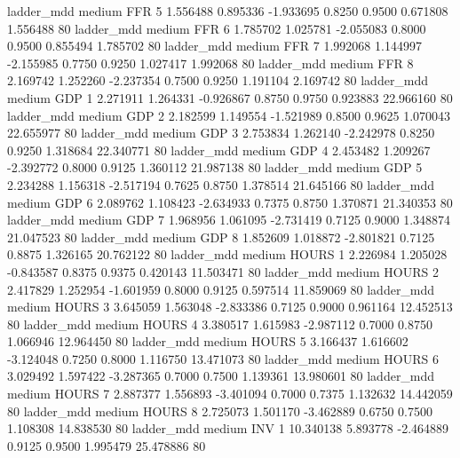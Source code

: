             ladder_mdd     medium      FFR                 5  1.556488 0.895336 -1.933695 0.8250 0.9500  0.671808    1.556488 80
            ladder_mdd     medium      FFR                 6  1.785702 1.025781 -2.055083 0.8000 0.9500  0.855494    1.785702 80
            ladder_mdd     medium      FFR                 7  1.992068 1.144997 -2.155985 0.7750 0.9250  1.027417    1.992068 80
            ladder_mdd     medium      FFR                 8  2.169742 1.252260 -2.237354 0.7500 0.9250  1.191104    2.169742 80
            ladder_mdd     medium      GDP                 1  2.271911 1.264331 -0.926867 0.8750 0.9750  0.923883   22.966160 80
            ladder_mdd     medium      GDP                 2  2.182599 1.149554 -1.521989 0.8500 0.9625  1.070043   22.655977 80
            ladder_mdd     medium      GDP                 3  2.753834 1.262140 -2.242978 0.8250 0.9250  1.318684   22.340771 80
            ladder_mdd     medium      GDP                 4  2.453482 1.209267 -2.392772 0.8000 0.9125  1.360112   21.987138 80
            ladder_mdd     medium      GDP                 5  2.234288 1.156318 -2.517194 0.7625 0.8750  1.378514   21.645166 80
            ladder_mdd     medium      GDP                 6  2.089762 1.108423 -2.634933 0.7375 0.8750  1.370871   21.340353 80
            ladder_mdd     medium      GDP                 7  1.968956 1.061095 -2.731419 0.7125 0.9000  1.348874   21.047523 80
            ladder_mdd     medium      GDP                 8  1.852609 1.018872 -2.801821 0.7125 0.8875  1.326165   20.762122 80
            ladder_mdd     medium    HOURS                 1  2.226984 1.205028 -0.843587 0.8375 0.9375  0.420143   11.503471 80
            ladder_mdd     medium    HOURS                 2  2.417829 1.252954 -1.601959 0.8000 0.9125  0.597514   11.859069 80
            ladder_mdd     medium    HOURS                 3  3.645059 1.563048 -2.833386 0.7125 0.9000  0.961164   12.452513 80
            ladder_mdd     medium    HOURS                 4  3.380517 1.615983 -2.987112 0.7000 0.8750  1.066946   12.964450 80
            ladder_mdd     medium    HOURS                 5  3.166437 1.616602 -3.124048 0.7250 0.8000  1.116750   13.471073 80
            ladder_mdd     medium    HOURS                 6  3.029492 1.597422 -3.287365 0.7000 0.7500  1.139361   13.980601 80
            ladder_mdd     medium    HOURS                 7  2.887377 1.556893 -3.401094 0.7000 0.7375  1.132632   14.442059 80
            ladder_mdd     medium    HOURS                 8  2.725073 1.501170 -3.462889 0.6750 0.7500  1.108308   14.838530 80
            ladder_mdd     medium      INV                 1 10.340138 5.893778 -2.464889 0.9125 0.9500  1.995479   25.478886 80
